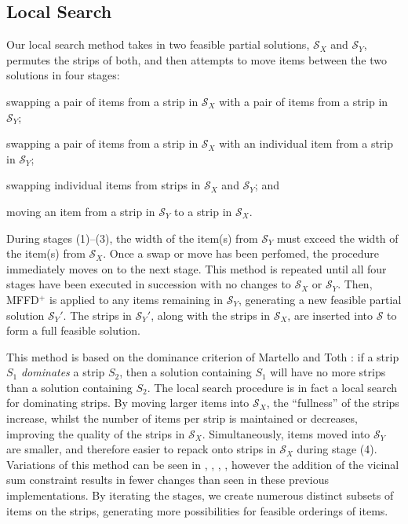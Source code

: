 \documentclass{elsarticle}
\begin{document}
\subsection{Local Search}
\label{sub:localsearch}
Our local search method takes in two feasible partial solutions, $\mathcal{S}_X$ and $\mathcal{S}_Y$, permutes the strips of both, and then attempts to move items between the two solutions in four stages: 
\begin{enumerate*}[label={(\arabic*)}]
	\item swapping a pair of items from a strip in $\mathcal{S}_X$ with a pair of items from a strip in $\mathcal{S}_Y$;
	\item swapping a pair of items from a strip in $\mathcal{S}_X$ with an individual item from a strip in $\mathcal{S}_Y$;
	\item swapping individual items from strips in $\mathcal{S}_X$ and $\mathcal{S}_Y$; and
	\item moving an item from a strip in $\mathcal{S}_Y$ to a strip in $\mathcal{S}_X$.
\end{enumerate*} 
During stages (1)--(3), the width of the item(s) from $\mathcal{S}_Y$ must exceed the width of the item(s) from $\mathcal{S}_X$. Once a swap or move has been perfomed, the procedure immediately moves on to the next stage. This method is repeated until all four stages have been executed in succession with no changes to $\mathcal{S}_X$ or $\mathcal{S}_Y$. Then, MFFD$^+$ is applied to any items remaining in $\mathcal{S}_Y$, generating a new feasible partial solution $\mathcal{S}_Y'$. The strips in $\mathcal{S}_Y'$, along with the strips in $\mathcal{S}_X$, are inserted into $\mathcal{S}$ to form a full feasible solution.

This method is based on the dominance criterion of Martello and Toth \cite{martello1990l}: if a strip $S_1$ \emph{dominates} a strip $S_2$, then a solution containing $S_1$ will have no more strips than a solution containing $S_2$. The local search procedure is in fact a local search for dominating strips. By moving larger items into $\mathcal{S}_X$, the ``fullness'' of the strips increase, whilst the number of items per strip is maintained or decreases, improving the quality of the strips in $\mathcal{S}_X$. Simultaneously, items moved into $\mathcal{S}_Y$ are smaller, and therefore easier to repack onto strips in $\mathcal{S}_X$ during stage (4). Variations of this method can be seen in \cite{falkenauer1996}, \cite{levine2004}, \cite{lewis2009}, \cite{lewis2017}, however the addition of the vicinal sum constraint results in fewer changes than seen in these previous implementations. By iterating the stages, we create numerous distinct subsets of items on the strips, generating more possibilities for feasible orderings of items.
\end{document}
